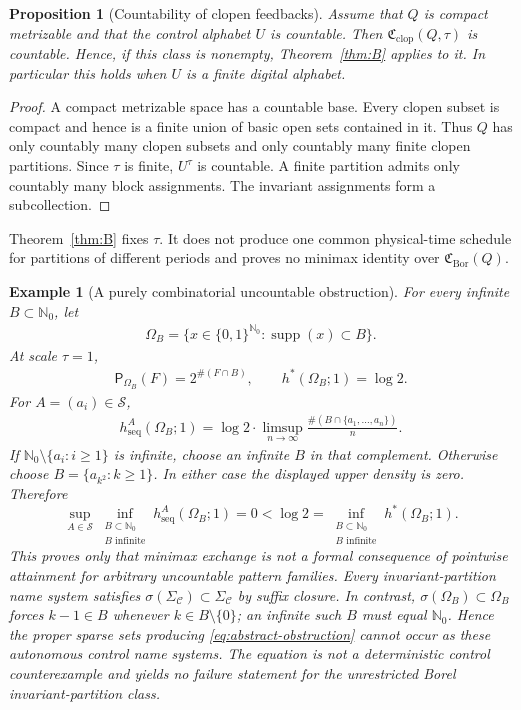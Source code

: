 \documentclass[11pt,reqno]{amsart}
\numberwithin{equation}{section}
\newtheorem{proposition}[theorem]{Proposition}
\newtheorem{example}[theorem]{Example}
\theoremstyle{definition}
\newcommand{\Nzero}{\mathbb N_0}
\newcommand{\C}{\mathcal C}
\newcommand{\Patt}{\mathsf P}
\newcommand{\hseq}{h_{\mathrm{seq}}}
\newcommand{\hpat}{h^{*}}
\newcommand{\Bor}{\mathrm{Bor}}
\newcommand{\clop}{\mathrm{clop}}
\newcommand{\supp}{\operatorname{supp}}
\begin{document}
\begin{proposition}[Countability of clopen feedbacks]
\label{prop:digital}
Assume that $Q$ is compact metrizable and that the control alphabet $U$ is
countable.  Then
$\mathfrak C_{\clop}(Q,\tau)$ is countable.  Hence, if this class is nonempty,
Theorem~\ref{thm:B} applies to it.  In particular this holds when $U$ is a
finite digital alphabet.
\end{proposition}

\begin{proof}
A compact metrizable space has a countable base.  Every clopen subset is
compact and hence is a finite union of basic open sets contained in it.  Thus
$Q$ has only countably many clopen subsets and only countably many finite
clopen partitions.  Since $\tau$ is finite, $U^\tau$ is countable.  A finite
partition admits only countably many block assignments.  The invariant assignments form a
subcollection.
\end{proof}

Theorem~\ref{thm:B} fixes $\tau$.  It does not produce one common
physical-time schedule for partitions of different periods and proves no
minimax identity over $\mathfrak C_{\Bor}(Q)$.

\begin{example}[A purely combinatorial uncountable obstruction]
\label{ex:uncountable}
For every infinite $B\subset\Nzero$, let
\begin{align*}
 \Omega_B=\{x\in\{0,1\}^{\Nzero}:\supp(x)\subset B\}.
\end{align*}
At scale $\tau=1$,
\begin{align*}
 \Patt_{\Omega_B}(F)=2^{\#(F\cap B)},
 \qquad \hpat(\Omega_B;1)=\log2.
\end{align*}
For $A=(a_i)\in\mathscr S$,
\begin{align*}
 \hseq^A(\Omega_B;1)
 =\log2\cdot\limsup_{n\to\infty}
 \frac{\#(B\cap\{a_1,\ldots,a_n\})}{n}.
\end{align*}
If $\Nzero\setminus\{a_i:i\ge1\}$ is infinite, choose an infinite $B$ in that
complement.  Otherwise choose $B=\{a_{k^2}:k\ge1\}$.  In either case the
displayed upper density is zero.  Therefore
\begin{equation}\label{eq:abstract-obstruction}
 \sup_{A\in\mathscr S}
 \inf_{\substack{B\subset\Nzero\\B\text{ infinite}}}
 \hseq^A(\Omega_B;1)=0
 <\log2
 =\inf_{\substack{B\subset\Nzero\\B\text{ infinite}}}
 \hpat(\Omega_B;1).
\end{equation}
This proves only that minimax exchange is not a formal consequence of
pointwise attainment for arbitrary uncountable pattern families.  Every
invariant-partition name system satisfies
$\sigma(\Sigma_\C)\subset\Sigma_\C$ by suffix closure.  In contrast,
$\sigma(\Omega_B)\subset\Omega_B$ forces $k-1\in B$ whenever
$k\in B\setminus\{0\}$; an infinite such $B$ must equal $\Nzero$.  Hence the
proper sparse sets producing \eqref{eq:abstract-obstruction} cannot occur as
these autonomous control name systems.  The equation is not a deterministic
control counterexample and yields no failure statement for the unrestricted
Borel invariant-partition class.
\end{example}
\end{document}
